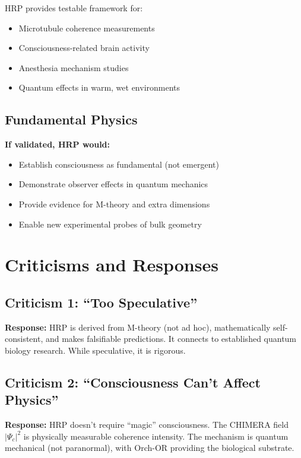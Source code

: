 HRP provides testable framework for:
\begin{itemize}
\item Microtubule coherence measurements
\item Consciousness-related brain activity
\item Anesthesia mechanism studies
\item Quantum effects in warm, wet environments
\end{itemize}

\subsection{Fundamental Physics}

\textbf{If validated, HRP would:}
\begin{itemize}
\item Establish consciousness as fundamental (not emergent)
\item Demonstrate observer effects in quantum mechanics
\item Provide evidence for M-theory and extra dimensions
\item Enable new experimental probes of bulk geometry
\end{itemize}

\section{Criticisms and Responses}

\subsection*{Criticism 1: ``Too Speculative''}

\textbf{Response:} HRP is derived from M-theory (not ad hoc), mathematically self-consistent, and makes falsifiable predictions. It connects to established quantum biology research. While speculative, it is rigorous.

\subsection*{Criticism 2: ``Consciousness Can't Affect Physics''}

\textbf{Response:} HRP doesn't require ``magic'' consciousness. The CHIMERA field $|\Psi_c|^2$ is physically measurable coherence intensity. The mechanism is quantum mechanical (not paranormal), with Orch-OR providing the biological substrate.


